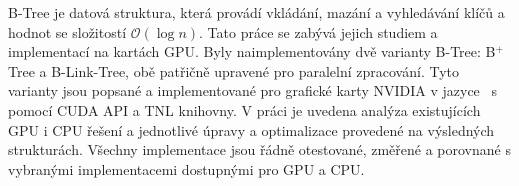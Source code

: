 B-Tree je datová struktura, která provádí vkládání, mazání a vyhledávání klíčů a hodnot se složitostí $\mathcal{O}(\log{n})$. Tato práce se zabývá jejich studiem a implementací na kartách GPU. Byly naimplementovány dvě varianty B-Tree: B$^+$Tree a B-Link-Tree, obě patřičně upravené pro paralelní zpracování. Tyto varianty jsou popsané a implementované pro grafické karty NVIDIA v jazyce \CC\ s pomocí CUDA API a TNL knihovny. V práci je uvedena analýza existujících GPU i CPU řešení a jednotlivé úpravy a optimalizace provedené na výsledných strukturách. Všechny implementace jsou řádně otestované, změřené a porovnané s vybranými implementacemi dostupnými pro GPU a CPU.